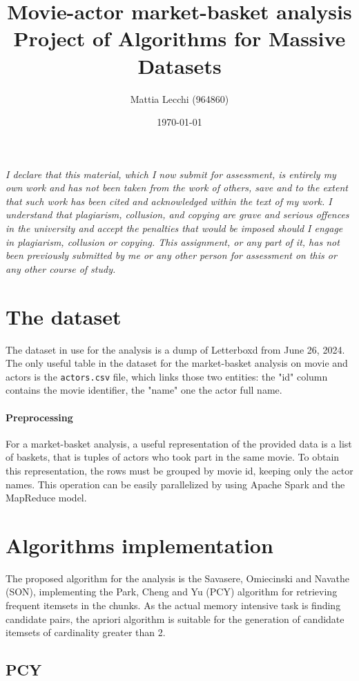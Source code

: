 \documentclass{article}
\author{Mattia Lecchi (964860)}
\date{\today}
\title{Movie-actor market-basket analysis\\ 
	\large Project of Algorithms for Massive Datasets}
\begin{document}
\maketitle
\textit{I declare that this material, which
	I now submit for assessment, is entirely my own work and has not been taken from the
	work of others, save and to the extent that such work has been cited and acknowledged within the
	text of my work. I understand that plagiarism, collusion, and copying are grave and
	serious offences in the university and accept the penalties that would be imposed should I engage
	in plagiarism, collusion or copying. This assignment, or any part of it, has not been previously
	submitted by me or any other person for assessment on this or any other course of study.}

\section{The dataset}
\label{sec:dataset}
The dataset in use for the analysis is a dump of Letterboxd from June 26, 2024.
The only useful table in the dataset for the market-basket analysis on movie and actors is the \texttt{actors.csv} file, which links those two entities: the "id" column contains the movie identifier, the "name" one the actor full name. 

\paragraph{Preprocessing}
For a market-basket analysis, a useful representation of the provided data is a list of baskets, that is tuples of actors who took part in the same movie. To obtain this representation, the rows must be grouped by movie id, keeping only the actor names. This operation can be easily parallelized by using Apache Spark and the MapReduce model. 

\section{Algorithms implementation}

The proposed algorithm for the analysis is the Savasere, Omiecinski and Navathe (SON), implementing the Park, Cheng and Yu (PCY) algorithm for retrieving frequent itemsets in the chunks. As the actual memory intensive task is finding candidate pairs, the apriori algorithm is suitable for the generation of candidate itemsets of cardinality greater than 2.

\subsection{PCY}
\end{document}
